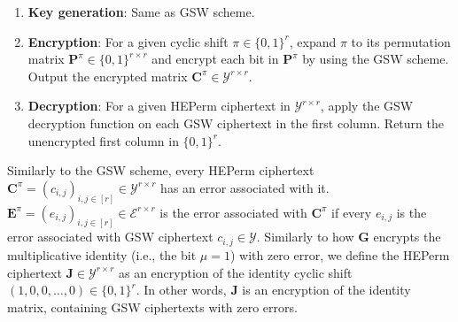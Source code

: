 \begin{enumerate}
    \item \textbf{Key generation}: Same as GSW scheme.
    \item \textbf{Encryption}: For a given cyclic shift $\pi \in \{0,1\}^r$, expand $\pi$ to its permutation matrix $\mathbf{P}^{\pi} \in \{0,1\}^{r \times r}$ and encrypt each bit in $\mathbf{P}^\pi$ by using the GSW scheme. Output the encrypted matrix $\mathbf{C}^{\pi} \in \mathcal{Y}^{r \times r}$. 
    \item \textbf{Decryption}: For a given HEPerm ciphertext in $\mathcal{Y}^{r \times r}$, apply the GSW decryption function on each GSW ciphertext in the first column. Return the unencrypted first column in $\{0,1\}^r$.
\end{enumerate}
Similarly to the GSW scheme, every HEPerm ciphertext $\mathbf{C}^{\pi} = (c_{i,j})_{i,j \in [r]} \in \mathcal{Y}^{r \times r}$ has an error associated with it. $\mathbf{E}^{\pi} = (e_{i,j})_{i,j \in [r]} \in \mathcal{E}^{r \times r}$ is the error associated with $\mathbf{C}^{\pi}$ if every $e_{i,j}$ is the error associated with GSW ciphertext $c_{i,j} \in \mathcal{Y}$. Similarly to how $\mathbf{G}$ encrypts the multiplicative identity (i.e., the bit $\mu = 1$) with zero error, we define the HEPerm ciphertext $\mathbf{J} \in \mathcal{Y}^{r \times r}$ as an encryption of the identity cyclic shift $(1, 0, 0, \dots, 0) \in \{0,1\}^{r}$. In other words, $\mathbf{J}$ is an encryption of the identity matrix, containing GSW ciphertexts with zero errors.

